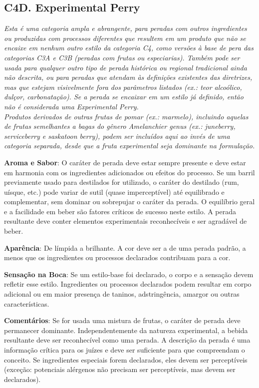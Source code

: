 \subsection*{C4D. Experimental Perry}

\textit{Esta é uma categoria ampla e abrangente, para peradas com outros ingredientes ou produzidas com processos diferentes que resultem em um produto que não se encaixe em nenhum outro estilo da categoria C4, como versões à base de pera das categorias C3A e C3B (peradas com frutas ou especiarias). Também pode ser usada para qualquer outro tipo de perada histórica ou regional tradicional ainda não descrita, ou para peradas que atendam às definições existentes das diretrizes, mas que estejam visivelmente fora dos parâmetros listados (ex.: teor alcoólico, dulçor, carbonatação). Se a perada se encaixar em um estilo já definido, então não é considerada uma Experimental Perry.} \\
\textit{Produtos derivados de outras frutas de pomar (ex.: marmelo), incluindo aquelas de frutas semelhantes a bagas do gênero \textit{Amelanchier genus} (ex.: \textit{juneberry}, \textit{serviceberry} e \textit{saskatoon berry}), podem ser incluídos aqui ao invés de uma categoria separada, desde que a fruta experimental seja dominante na formulação.}

\textbf{Aroma e Sabor}: O caráter de perada deve estar sempre presente e deve estar em harmonia com os ingredientes adicionados ou efeitos do processo. Se um barril previamente usado para destilados for utilizado, o caráter do destilado (rum, uísque, etc.) pode variar de sutil (quase imperceptível) até equilibrado e complementar, sem dominar ou sobrepujar o caráter da perada. O equilíbrio geral e a facilidade em beber são fatores críticos de sucesso neste estilo. A perada resultante deve conter elementos experimentais reconhecíveis e ser agradável de beber.

\textbf{Aparência}: De límpida a brilhante. A cor deve ser a de uma perada padrão, a menos que os ingredientes ou processos declarados contribuam para a cor.

\textbf{Sensação na Boca}: Se um estilo-base foi declarado, o corpo e a sensação devem refletir esse estilo. Ingredientes ou processos declarados podem resultar em corpo adicional ou em maior presença de taninos, adstringência, amargor ou outras características.

\textbf{Comentários}: Se for usada uma mistura de frutas, o caráter de perada deve permanecer dominante. Independentemente da natureza experimental, a bebida resultante deve ser reconhecível como uma perada. A descrição da perada é uma informação crítica para os juízes e deve ser suficiente para que compreendam o conceito. Se ingredientes especiais forem declarados, eles devem ser perceptíveis (exceção: potenciais alérgenos não precisam ser perceptíveis, mas devem ser declarados).

